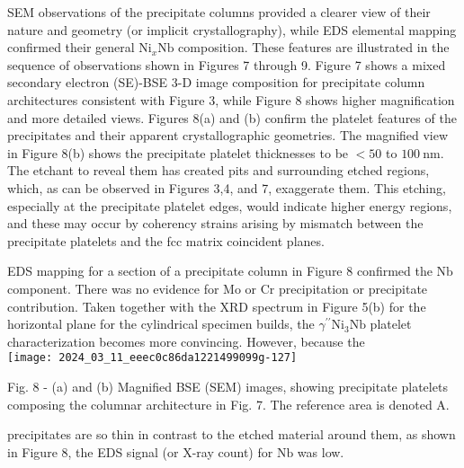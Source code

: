 \documentclass[10pt]{article}
\begin{document}
SEM observations of the precipitate columns provided a clearer view of their nature and geometry (or implicit crystallography), while EDS elemental mapping confirmed their general $\mathrm{Ni}_{x} \mathrm{Nb}$ composition. These features are illustrated in the sequence of observations shown in Figures 7 through 9. Figure 7 shows a mixed secondary electron (SE)-BSE 3-D image composition for precipitate column architectures consistent with Figure 3, while Figure 8 shows higher magnification and more detailed views. Figures 8(a) and (b) confirm the platelet features of the precipitates and their apparent crystallographic geometries. The magnified view in Figure 8(b) shows the precipitate platelet thicknesses to be $<50$ to $100 \mathrm{~nm}$. The etchant to reveal them has created pits and surrounding etched regions, which, as can be observed in Figures 3,4, and 7, exaggerate them. This etching, especially at the precipitate platelet edges, would indicate higher energy regions, and these may occur by coherency strains arising by mismatch between the precipitate platelets and the fcc matrix coincident planes.

EDS mapping for a section of a precipitate column in Figure 8 confirmed the $\mathrm{Nb}$ component. There was no evidence for Mo or $\mathrm{Cr}$ precipitation or precipitate contribution. Taken together with the XRD spectrum in Figure 5(b) for the horizontal plane for the cylindrical specimen builds, the $\gamma^{\prime \prime} \mathrm{Ni}_{3} \mathrm{Nb}$ platelet characterization becomes more convincing. However, because the\\
\texttt{[image: 2024\_03\_11\_eeec0c86da1221499099g-127]}

Fig. 8 - (a) and (b) Magnified BSE (SEM) images, showing precipitate platelets composing the columnar architecture in Fig. 7. The reference area is denoted A.

precipitates are so thin in contrast to the etched material around them, as shown in Figure 8, the EDS signal (or X-ray count) for $\mathrm{Nb}$ was low.
\end{document}
